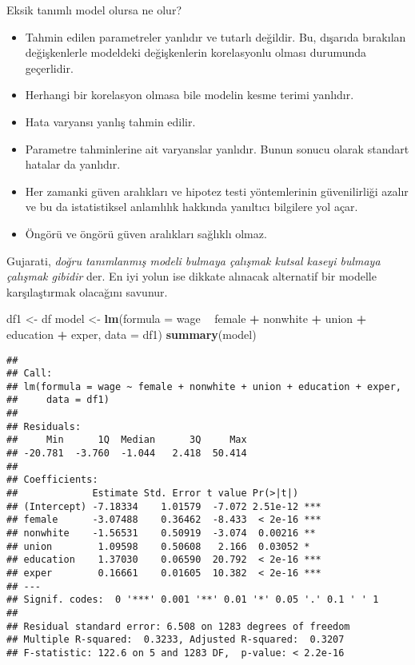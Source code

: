 \documentclass[
]{book}
\newenvironment{Shaded}{\begin{snugshade}}{\end{snugshade}}
\newcommand{\DataTypeTok}[1]{\textcolor[rgb]{0.13,0.29,0.53}{#1}}
\newcommand{\KeywordTok}[1]{\textcolor[rgb]{0.13,0.29,0.53}{\textbf{#1}}}
\newcommand{\NormalTok}[1]{#1}
\newcommand{\OperatorTok}[1]{\textcolor[rgb]{0.81,0.36,0.00}{\textbf{#1}}}
\newcommand{\StringTok}[1]{\textcolor[rgb]{0.31,0.60,0.02}{#1}}
\begin{document}
Eksik tanımlı model olursa ne olur?

\begin{itemize}
\item
  Tahmin edilen parametreler yanlıdır ve tutarlı değildir. Bu, dışarıda bırakılan değişkenlerle modeldeki değişkenlerin korelasyonlu olması durumunda geçerlidir.
\item
  Herhangi bir korelasyon olmasa bile modelin kesme terimi yanlıdır.
\item
  Hata varyansı yanlış tahmin edilir.
\item
  Parametre tahminlerine ait varyanslar yanlıdır. Bunun sonucu olarak standart hatalar da yanlıdır.
\item
  Her zamanki güven aralıkları ve hipotez testi yöntemlerinin güvenilirliği azalır ve bu da istatistiksel anlamlılık hakkında yanıltıcı bilgilere yol açar.
\item
  Öngörü ve öngörü güven aralıkları sağlıklı olmaz.
\end{itemize}

Gujarati, \emph{doğru tanımlanmış modeli bulmaya çalışmak kutsal kaseyi bulmaya çalışmak gibidir} der. En iyi yolun ise dikkate alınacak alternatif bir modelle karşılaştırmak olacağını savunur.

\begin{Shaded}
\begin{Highlighting}[]
\NormalTok{df1 <-}\StringTok{ }\NormalTok{df}
\NormalTok{model <-}\StringTok{ }\KeywordTok{lm}\NormalTok{(}\DataTypeTok{formula =}\NormalTok{ wage }\OperatorTok{~}\StringTok{ }\NormalTok{female }\OperatorTok{+}\StringTok{ }\NormalTok{nonwhite }\OperatorTok{+}\StringTok{ }\NormalTok{union }\OperatorTok{+}\StringTok{ }\NormalTok{education }\OperatorTok{+}\StringTok{ }\NormalTok{exper, }\DataTypeTok{data =}\NormalTok{ df1)}
\KeywordTok{summary}\NormalTok{(model)}
\end{Highlighting}
\end{Shaded}

\begin{verbatim}
## 
## Call:
## lm(formula = wage ~ female + nonwhite + union + education + exper, 
##     data = df1)
## 
## Residuals:
##     Min      1Q  Median      3Q     Max 
## -20.781  -3.760  -1.044   2.418  50.414 
## 
## Coefficients:
##             Estimate Std. Error t value Pr(>|t|)    
## (Intercept) -7.18334    1.01579  -7.072 2.51e-12 ***
## female      -3.07488    0.36462  -8.433  < 2e-16 ***
## nonwhite    -1.56531    0.50919  -3.074  0.00216 ** 
## union        1.09598    0.50608   2.166  0.03052 *  
## education    1.37030    0.06590  20.792  < 2e-16 ***
## exper        0.16661    0.01605  10.382  < 2e-16 ***
## ---
## Signif. codes:  0 '***' 0.001 '**' 0.01 '*' 0.05 '.' 0.1 ' ' 1
## 
## Residual standard error: 6.508 on 1283 degrees of freedom
## Multiple R-squared:  0.3233, Adjusted R-squared:  0.3207 
## F-statistic: 122.6 on 5 and 1283 DF,  p-value: < 2.2e-16
\end{verbatim}
\end{document}
